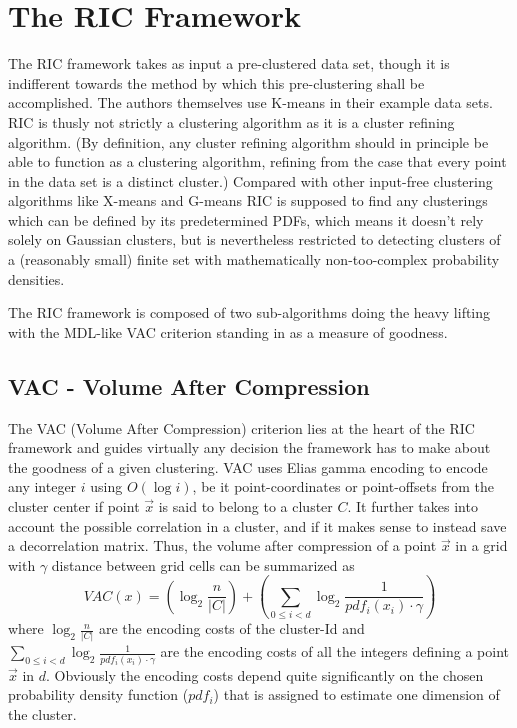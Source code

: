 \documentclass[conference]{IEEEtran}
\begin{document}
\section{The RIC Framework}
\label{sec:ric}
The RIC framework takes as input a pre-clustered data set, though it is indifferent towards the method by which this pre-clustering shall be accomplished. The authors themselves use K-means in their example data sets. RIC is thusly not strictly a clustering algorithm as it is a cluster refining algorithm\cite{Bohm2008-eh}. (By definition, any cluster refining algorithm should in principle be able to function as a clustering algorithm, refining from the case that every point in the data set is a distinct cluster.) Compared with other input-free clustering algorithms like X-means\cite{Hamerly2003-hm} and G-means\cite{Pelleg2000-jr} RIC is supposed to find any clusterings which can be defined by its predetermined PDFs, which means it doesn't rely solely on Gaussian clusters, but is nevertheless restricted to detecting clusters of a (reasonably small) finite set with mathematically non-too-complex probability densities.

The RIC framework is composed of two sub-algorithms doing the heavy lifting with the MDL-like VAC criterion standing in as a measure of goodness.
\subsection{VAC - Volume After Compression}
The VAC (Volume After Compression) criterion lies at the heart of the RIC framework and guides virtually any decision the framework has to make about the goodness of a given clustering. VAC uses Elias gamma encoding\cite{Elias1975-wj} to encode any integer $i$ using $O(\log i)$, be it point-coordinates or point-offsets from the cluster center if point $\vec{x}$ is said to belong to a cluster $C$. It further takes into account the possible correlation in a cluster, and if it makes sense to instead save a decorrelation matrix. Thus, the volume after compression of a point $ \vec{x} $ in a grid with $ \gamma $ distance between grid cells can be summarized as 
\[ VAC(x) = \left(\log_2 \frac{n}{|C|} \right) + \left(\sum_{0 \leq i < d} \log_2 \frac{1}{pdf_i(x_i) \cdot \gamma} \right) \]
where $ \log_2 \frac{n}{|C|} $ are the encoding costs of the cluster-Id and $ \sum_{0 \leq i < d} \log_2 \frac{1}{pdf_i(x_i) \cdot \gamma} $ are the encoding costs of all the integers defining a point $ \vec{x} $ in $ d $. Obviously the encoding costs depend quite significantly on the chosen probability density function ($ pdf_i $) that is assigned to estimate one dimension of the cluster.
\end{document}
